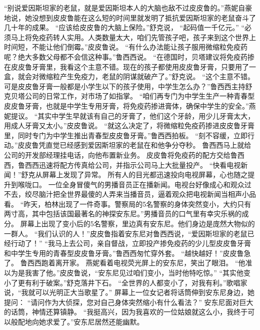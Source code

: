 \documentclass[a4paper,12pt,UTF8,twoside]{ctexbook}
\begin{document}
        “别说爱因斯坦家的老鼠，就是爱因斯坦本人的大脑也敌不过皮皮鲁的。”燕妮自豪地说，她没想到皮皮鲁能在这么短的时间里就发明了抵抗爱因斯坦家的老鼠奋斗了几十年的成果。  
        “应该给皮皮鲁的大脑上保险。”舒克说，  “起码值一千亿元。”  
        “必须马上将免疫药转人实用。人类数量太大，咱们先管孩子吧，孩子来到这个世界上时间短，不能让他们倒霉。”皮皮鲁说。  
        “有什么办法能让孩子服用微缩粒免疫药呢？绝大多数父母都不会信这种事。”鲁西西说。  
        “在德国时，贝塔建议将免疫药掺在皮皮鲁牙膏里，我看这个主意不错。现在的孩子都使用皮皮鲁牙膏，只要用了一盒，就会对微缩粒产生免疫力，老鼠的阴谋就破产了。”舒克说。        
        “这个主意不错。可是皮皮鲁牙膏一般都是小学生以下的孩子使用，中学生怎么办？”鲁西西主持舒克贝塔公司的日常工作，对市场了如指掌。  
        “咱们再专门为中学生生产一种青春型皮皮鲁牙膏，也就是中学生专用牙膏，将免疫药掺进膏体，确保中学生的安全。”燕妮提议。  
        “其实中学生早就该有自己的牙膏了，他们这个牙龄，用少儿牙膏太大，用成人牙膏又太小。”皮皮鲁说。  
        “就这么决定了，将微缩粒免疫药掺进皮皮鲁牙膏里，同时专门为中学生推出青春型皮皮鲁牙膏。”鲁西西拍板。  
        “刻不容缓，立即行动。”皮皮鲁凭直觉已经感到爱因斯坦家的老鼠在和他争分夺秒。  
        鲁西西马上就给公司的开发部经理挂电话，向他布置新业务。  
        皮皮鲁将免疫药的配方交给鲁西西，鲁西西迅速将配方传真给公司，并指示公司马上大批量投产。  
        “快看电视新闻！”舒克从屏幕上发现了异常。  
        所有人的目光都迅速投向电视屏幕，心也随之提升到喉咙口。  
        一位全身冒傻气的男播音员正在播新闻。电视台好像成心和观众过不去，绞尽脑汁把全世界最傻的人弄来当播音员，逼着观众把电视新闻当相声小品看。  
        “昨天，柏林出现了一件奇事。警察局的5名警察的身体突然变小，大约只有两寸高，其中包括该国最著名的神探安东尼。”男播音员的口气里有幸灾乐祸的成分。  
        屏幕上出现了变小后的5名警察，里边真有安东尼。他们身边是庞然大物似的一群人。  
        “我们认识的人！”皮皮鲁指着安东尼对鲁西西说，“爱因斯坦家的老鼠已经行动了！”  
        “我马上去公司，亲自督战，立即投产掺免疫药的少儿型皮皮鲁牙膏和中学生专用的青春型皮皮鲁牙膏。”鲁西西匆忙穿外套。  
        “越快越好！”皮皮鲁急了。  
        鲁西西跑着离开家。  
        燕妮看着电视荧光屏上的安东尼，笑出了眼泪。  
        “他准以为是我害了他。”皮皮鲁说，“安东尼见过咱们变小，当时他特吃惊。”  
        “其实他变小了更有利于破案。”舒克落井下石。  
        “全世界的人都变小了，对我有利。”歌唱家说，“我就可以光明正大当歌星了。”  
        屏幕上一位女记者将话筒伸到安东尼身边，她提问：  
        “请问作为大侦探，您对自己身体突然缩小有什么看法？”        
        安东尼面对巨大的话筒，神情还算镇静。  
        “我挺高兴，因为我喜欢的一位姑娘就这么小，我终于可以般配地向她求爱了。”安东尼居然还能幽默。  
\end{document}
